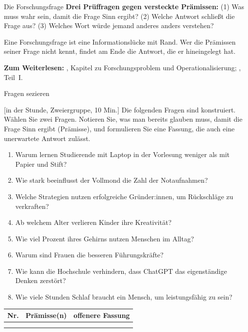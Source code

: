 \begin{handout}{Die Forschungsfrage}
\textbf{Drei Prüffragen gegen versteckte Prämissen:} (1) Was muss wahr sein,
damit die Frage Sinn ergibt? (2) Welche Antwort schließt die Frage aus?
(3) Welches Wort würde jemand anderes anders verstehen?

\begin{merkbox}
Eine Forschungsfrage ist eine Informationslücke mit Rand. Wer die Prämissen
seiner Frage nicht kennt, findet am Ende die Antwort, die er hineingelegt
hat.
\end{merkbox}

\textbf{Zum Weiterlesen:} \textcite{doering2016forschungsmethoden},
Kapitel zu Forschungsproblem und Operationalisierung;
\textcite{booth2016craft}, Teil~I.
\end{handout}

\begin{uebungsblatt}{Fragen sezieren}

[in der Stunde, Zweiergruppe, 10 Min.]
Die folgenden Fragen sind konstruiert. Wählen Sie zwei Fragen. Notieren Sie,
was man bereits glauben muss, damit die Frage Sinn ergibt (Prämisse), und
formulieren Sie eine Fassung, die auch eine unerwartete Antwort zulässt.

\begin{enumerate}
  \item Warum lernen Studierende mit Laptop in der Vorlesung weniger als mit
    Papier und Stift?
  \item Wie stark beeinflusst der Vollmond die Zahl der Notaufnahmen?
  \item Welche Strategien nutzen erfolgreiche Gründer:innen, um Rückschläge
    zu verkraften?
  \item Ab welchem Alter verlieren Kinder ihre Kreativität?
  \item Wie viel Prozent ihres Gehirns nutzen Menschen im Alltag?
  \item Warum sind Frauen die besseren Führungskräfte?
  \item Wie kann die Hochschule verhindern, dass ChatGPT das eigenständige
    Denken zerstört?
  \item Wie viele Stunden Schlaf braucht ein Mensch, um leistungsfähig zu
    sein?
\end{enumerate}

\begin{center}
\renewcommand{\arraystretch}{2.2}
\begin{tabular}{|p{}|p{}|p{}|}
\hline
\textbf{Nr.} & \textbf{Prämisse(n)} & \textbf{offenere Fassung} \\
\hline
 & & \\ \hline
 & & \\ \hline
\end{tabular}
\end{center}


\end{uebungsblatt}

